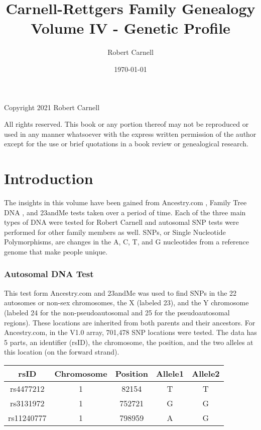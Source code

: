 \documentclass[11pt,letter]{book}
\title{\bf Carnell-Rettgers Family Genealogy \\
       \large Volume IV - Genetic Profile}
\author{Robert Carnell}
\date{\today}
\begin{document}
\frontmatter
\maketitle
\clearpage

\begingroup
\parindent 0pt
\parskip
\baselineskip
Copyright \textcopyright{} 2021 Robert Carnell

All rights reserved.  This book or any portion thereof may not be reproduced or used in any manner whatsoever with the express written permission of the author except for the use or brief quotations in a book review or genealogical research.
\endgroup
\clearpage

\tableofcontents
\mainmatter

\chapter{Introduction}

The insights in this volume have been gained from Ancestry.com , Family Tree DNA , and 23andMe  tests taken over a period of time.  Each of the three main types of DNA were tested for Robert Carnell and autosomal SNP tests were performed for other family members as well.  SNPs, or Single Nucleotide Polymorphisms, are changes in the A, C, T, and G nucleotides from a reference genome that make people unique.

\subsection{Autosomal DNA Test}

This test form Ancestry.com and 23andMe was used to find SNPs in the 22 autosomes or non-sex chromosomes, the X (labeled 23), and the Y chromosome (labeled 24 for the non-pseudoautosomal and 25 for the pseudoautosomal regions).  These locations are inherited from both parents and their ancestors.  For Ancestry.com, in the V1.0 array, 701,478 SNP locations were tested.  The data has 5 parts, an identifier (rsID), the chromosome, the position, and the two alleles at this location (on the forward strand).

\begin{center}
\begin{tabular}{c | c | c | c | c}
	rsID & Chromosome & Position & Allele1 & Allele2 \\
	\hline
	rs4477212 & 1 & 82154 & T & T \\
	rs3131972 & 1 & 752721 & G & G \\
	rs11240777 & 1 & 798959 & A & G \\
\end{tabular}
\end{center}
\end{document}
